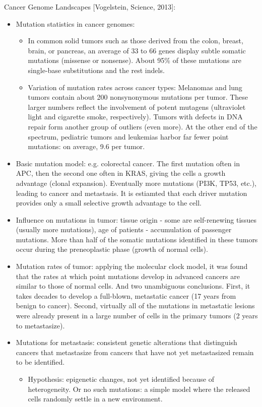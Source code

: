 \documentclass{report}
\begin{document}
Cancer Genome Landscapes [Vogelstein, Science, 2013]: 
\begin{itemize}
	\item Mutation statistics in cancer genomes: 
	\begin{itemize}
		\item In common solid tumors such as those derived from the colon, breast, brain, or pancreas, an average of 33 to 66 genes display subtle somatic mutations (missense or nonsense). About 95\% of these mutations are single-base substitutions and the rest indels. 
		\item Variation of mutation rates across cancer types: Melanomas and lung tumors contain about 200 nonsynonymous mutations per tumor. These larger numbers reflect the involvement of potent mutagens (ultraviolet light and cigarette smoke, respectively). Tumors with defects in DNA repair form another group of outliers (even more). At the other end of the spectrum, pediatric tumors and leukemias harbor far fewer point mutations: on average, 9.6 per tumor. 
	\end{itemize}
	
	\item Basic mutation model: e.g. colorectal cancer. The first mutation often in APC, then the second one often in KRAS, giving the cells a growth advantage (clonal expansion). Eventually more mutations (PI3K, TP53, etc.), leading to cancer and metastasis. It is estiamted that each driver mutation provides only a small selective growth advantage to the cell.
	
	\item Influence on mutations in tumor: tissue origin - some are self-renewing tissues (usually more mutations), age of patients - accumulation of passenger mutations. More than half of the somatic mutations identified in these tumors occur during the preneoplastic phase (growth of normal cells). 
	
	\item Mutation rates of tumor: applying the molecular clock model, it was found that the rates at which point mutations develop in advanced cancers are similar to those of normal cells. And two unambiguous conclusions. First, it takes decades to develop a full-blown, metastatic cancer (17 years from benign to cancer). Second, virtually all of the mutations in metastatic lesions were already present in a large number of cells in the primary tumors (2 years to metastasize).
	
	\item Mutations for metastasis: consistent genetic alterations that distinguish cancers that metastasize from cancers that have not yet metastasized remain to be identified.
	\begin{itemize}
		\item Hypothesis: epigenetic changes, not yet identified because of heterogeneity. Or no such mutations: a simple model where the released cells randomly settle in a new environment. 
	\end{itemize}
	

\end{itemize}
\end{document}
